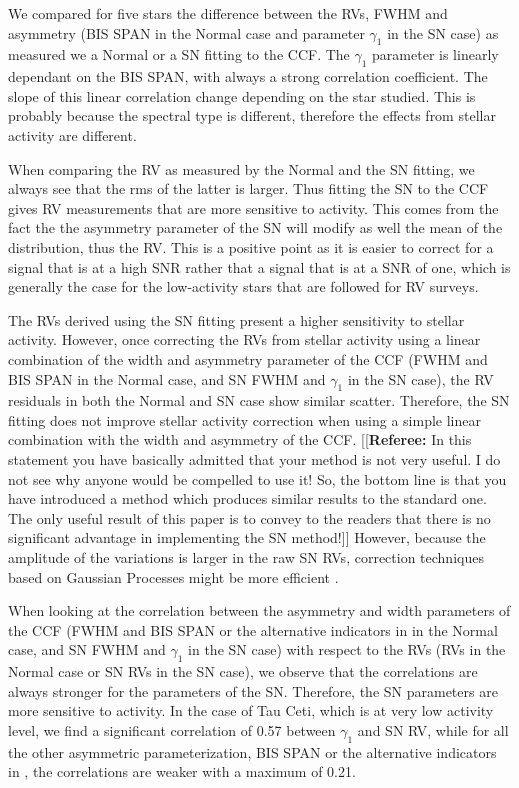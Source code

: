 \documentclass[11pt, oneside]{article}
\def\kms{\hbox{\,km\,s$^{-1}$}}       %
\newcommand{\comment}[1]{{\color{red}[[\textbf{Referee: }#1]]}}
\begin{document}
We compared for five stars the difference between the RVs, FWHM and asymmetry (BIS SPAN in the Normal case and parameter $\gamma_1$ in the SN case) as measured we a Normal or a SN fitting to the CCF. The $\gamma_1$ parameter is linearly dependant on the BIS SPAN, with always a strong correlation coefficient. 
The slope of this linear correlation change depending on the star studied. This is probably because the spectral type is different, therefore the effects from stellar activity are different.

When comparing the RV as measured by the Normal and the SN fitting, we always see that the rms of the latter is larger. Thus fitting the SN to the CCF gives RV measurements that are more sensitive to activity. This comes from the fact the the asymmetry parameter of the SN will modify as well the mean of the distribution, thus the RV. This is a positive point as it is easier to correct for a signal that is at a high SNR rather that a signal that is at a SNR of one, which is generally the case for the low-activity stars that are followed for RV surveys.

The RVs derived using the SN fitting present a higher sensitivity to stellar activity. However, once correcting the RVs from stellar activity using a linear combination of the width and asymmetry parameter of the CCF (FWHM and BIS SPAN in the Normal case, and SN FWHM and $\gamma_1$ in the SN case), the RV residuals in both the Normal and SN case show similar scatter. Therefore, the SN fitting does not improve stellar activity correction when using a simple linear combination with the width and asymmetry of the CCF. 
\comment{In this statement you have basically admitted that your method is not very useful. I do not see why anyone would be compelled to use it!
So, the bottom line is that you have introduced a method which produces similar results to the standard one. The only useful result of this paper is to convey to the readers that there is no significant advantage in implementing the SN method!}
However, because the amplitude of the variations is larger in the raw SN RVs, correction techniques based on Gaussian Processes might be more efficient \citep[][]{Haywood-2014,Faria-2016a}. 

When looking at the correlation between the asymmetry and width parameters of the CCF (FWHM and BIS SPAN or the alternative indicators in \citet{Figueira-2013} in the Normal case, and SN FWHM and $\gamma_1$ in the SN case) with respect to the RVs (RVs in the Normal case or SN RVs in the SN case), we observe that the correlations are always stronger for the parameters of the SN. Therefore, the SN parameters are more sensitive to activity. In the case of Tau Ceti, which is at very low activity level, we find a significant correlation of 0.57 between $\gamma_1$ and SN RV, while for all the other asymmetric parameterization, BIS SPAN or the alternative indicators in \citet{Figueira-2013}, the correlations are weaker with a maximum of 0.21.
\end{document}

